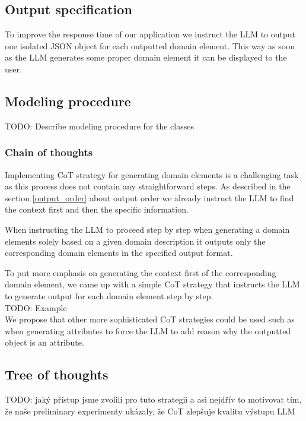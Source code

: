 \subsection{Output specification}
To improve the response time of our application we instruct the LLM to output one isolated JSON object for each outputted domain element. This way as soon as the LLM generates some proper domain element it can be displayed to the user.


\subsection{Modeling procedure}

TODO: Describe modeling procedure for the classes \\


\subsubsection{Chain of thoughts}

Implementing CoT strategy for generating domain elements is a challenging task as this process does not contain any straightforward steps. As described in the section \ref{output_order} about output order we already instruct the LLM to find the context first and then the specific information.

When instructing the LLM to proceed step by step when generating a domain elements solely based on a given domain description it outputs only the corresponding domain elements in the specified output format.

To put more emphasis on generating the context first of the corresponding domain element, we came up with a simple CoT strategy that instructs the LLM to generate output for each domain element step by step. \\

TODO: Example \\

We propose that other more sophisticated CoT strategies could be used such as when generating attributes to force the LLM to add reason why the outputted object is an attribute. 


\subsection{Tree of thoughts}

TODO: jaký přístup jsme zvolili pro tuto strategii a asi nejdřív to motivovat tím, že naše preliminary experimenty ukázaly, že CoT zlepšuje kvalitu výstupu LLM \\


